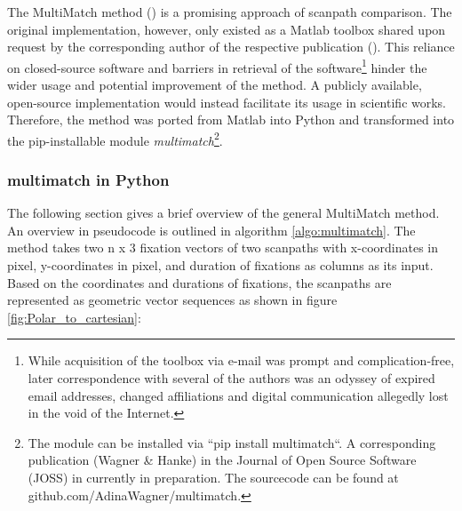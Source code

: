 \documentclass[a4paper, 12pt]{scrreprt}
\begin{document}
The MultiMatch method (\cite{jarodzka2010vector}) is a promising approach of scanpath comparison. The original implementation, however, only existed as a Matlab toolbox shared upon request by the corresponding author of the respective publication (\cite{dewhurst2012depends}). This reliance on closed-source software and barriers in retrieval of the software\footnote{While acquisition of the toolbox via e-mail was prompt and complication-free, later correspondence with several of the authors was an odyssey of expired email addresses, changed affiliations and digital communication allegedly lost in the void of the Internet.} hinder the wider usage and potential improvement of the method. A publicly available, open-source implementation would instead facilitate its usage in scientific works. Therefore, the method was ported from Matlab into Python and transformed into the pip-installable module \textit{multimatch}\footnote{The module can be installed via ``pip install multimatch``. A corresponding publication (Wagner \& Hanke) in the Journal of Open Source Software (JOSS) in currently in preparation. The sourcecode can be found at github.com/AdinaWagner/multimatch.}.

\subsubsection{multimatch in Python}
The following section gives a brief overview of the general MultiMatch method. An overview in pseudocode is outlined in algorithm \ref{algo:multimatch}. \newline 
The method takes two n x 3 fixation vectors of two scanpaths with x-coordinates in pixel, y-coordinates in pixel, and duration of fixations as columns as its input. Based on the coordinates and durations of fixations, the scanpaths are represented as geometric vector sequences as shown in figure \ref{fig:Polar_to_cartesian}:
\end{document}
